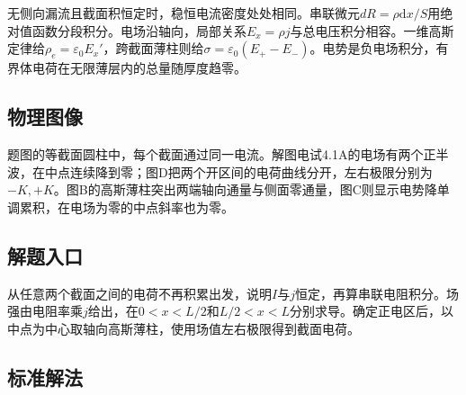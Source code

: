 \documentclass[UTF8,fontset=fandol,a4paper,11pt]{ctexart}
\begin{document}
无侧向漏流且截面积恒定时，稳恒电流密度处处相同。串联微元$dR=\rho\mathrm dx/S$用绝对值函数分段积分。电场沿轴向，局部关系$E_x=\rho j$与总电压积分相容。一维高斯定律给$\rho_e=\varepsilon_0E_x'$，跨截面薄柱则给$\sigma=\varepsilon_0(E_+-E_-)$。电势是负电场积分，有界体电荷在无限薄层内的总量随厚度趋零。



\subsection*{物理图像}

题图的等截面圆柱中，每个截面通过同一电流。解图电试4.1A的电场有两个正半波，在中点连续降到零；图D把两个开区间的电荷曲线分开，左右极限分别为$-K,+K$。图B的高斯薄柱突出两端轴向通量与侧面零通量，图C则显示电势降单调累积，在电场为零的中点斜率也为零。



\subsection*{解题入口}

从任意两个截面之间的电荷不再积累出发，说明$I$与$j$恒定，再算串联电阻积分。场强由电阻率乘$j$给出，在$0<x<L/2$和$L/2<x<L$分别求导。确定正电区后，以中点为中心取轴向高斯薄柱，使用场值左右极限得到截面电荷。



\subsection*{标准解法}
\end{document}
